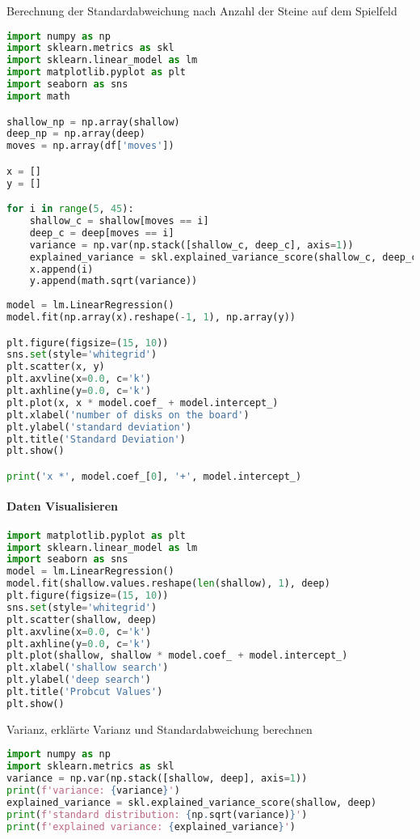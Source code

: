 Berechnung der Standardabweichung nach Anzahl der Steine auf dem
Spielfeld

\begin{lstlisting}[language=Python]
import numpy as np
import sklearn.metrics as skl
import sklearn.linear_model as lm
import matplotlib.pyplot as plt
import seaborn as sns
import math

shallow_np = np.array(shallow)
deep_np = np.array(deep)
moves = np.array(df['moves'])

x = []
y = []

for i in range(5, 45):
    shallow_c = shallow[moves == i]
    deep_c = deep[moves == i]
    variance = np.var(np.stack([shallow_c, deep_c], axis=1))
    explained_variance = skl.explained_variance_score(shallow_c, deep_c)
    x.append(i)
    y.append(math.sqrt(variance))
    
model = lm.LinearRegression()
model.fit(np.array(x).reshape(-1, 1), np.array(y))

plt.figure(figsize=(15, 10))
sns.set(style='whitegrid')
plt.scatter(x, y)
plt.axvline(x=0.0, c='k')
plt.axhline(y=0.0, c='k')
plt.plot(x, x * model.coef_ + model.intercept_)
plt.xlabel('number of disks on the board')
plt.ylabel('standard deviation')
plt.title('Standard Deviation')
plt.show()

print('x *', model.coef_[0], '+', model.intercept_)
\end{lstlisting}

\hypertarget{daten-visualisieren}{%
\paragraph{Daten Visualisieren}\label{daten-visualisieren}}

\begin{lstlisting}[language=Python]
import matplotlib.pyplot as plt
import sklearn.linear_model as lm
import seaborn as sns
model = lm.LinearRegression()
model.fit(shallow.values.reshape(len(shallow), 1), deep)
plt.figure(figsize=(15, 10))
sns.set(style='whitegrid')
plt.scatter(shallow, deep)
plt.axvline(x=0.0, c='k')
plt.axhline(y=0.0, c='k')
plt.plot(shallow, shallow * model.coef_ + model.intercept_)
plt.xlabel('shallow search')
plt.ylabel('deep search')
plt.title('Probcut Values')
plt.show()
\end{lstlisting}

Varianz, erklärte Varianz und Standardabweichung berechnen

\begin{lstlisting}[language=Python]
import numpy as np
import sklearn.metrics as skl
variance = np.var(np.stack([shallow, deep], axis=1))
print(f'variance: {variance}')
explained_variance = skl.explained_variance_score(shallow, deep)
print(f'standard distribution: {np.sqrt(variance)}')
print(f'explained variance: {explained_variance}')
\end{lstlisting}
